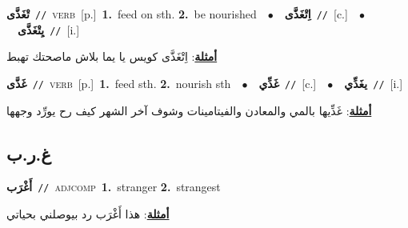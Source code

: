 \documentclass[10pt,a4paper,twoside]{article} %
\begin{document}
\begin{multicols}{2}
{\setlength\topsep{0pt}\textbf{\foreignlanguage{arabic}{تْغَذَّى}}\ {\color{gray}\texttt{//}\color{black}}\ \textsc{verb}\ [p.]\ \textbf{1.}~feed on sth.  \textbf{2.}~be nourished\ \ $\bullet$\ \ \setlength\topsep{0pt}\textbf{\foreignlanguage{arabic}{اِتْغَذَّى}}\ {\color{gray}\texttt{//}\color{black}}\ [c.]\ \ $\bullet$\ \ \setlength\topsep{0pt}\textbf{\foreignlanguage{arabic}{يِتْغَذَّى}}\ {\color{gray}\texttt{//}\color{black}}\ [i.]\  \begin{flushright}\color{gray}\foreignlanguage{arabic}{\textbf{\underline{\foreignlanguage{arabic}{أمثلة}}}: اِتْغَذَّى كويس يا يما بلاش ماصحتك تهبط}\end{flushright}\color{black}} \vspace{2mm}

{\setlength\topsep{0pt}\textbf{\foreignlanguage{arabic}{غَذَّى}}\ {\color{gray}\texttt{//}\color{black}}\ \textsc{verb}\ [p.]\ \textbf{1.}~feed sth.  \textbf{2.}~nourish sth\ \ $\bullet$\ \ \setlength\topsep{0pt}\textbf{\foreignlanguage{arabic}{غَذِّي}}\ {\color{gray}\texttt{//}\color{black}}\ [c.]\ \ $\bullet$\ \ \setlength\topsep{0pt}\textbf{\foreignlanguage{arabic}{يغَذِّي}}\ {\color{gray}\texttt{//}\color{black}}\ [i.]\  \begin{flushright}\color{gray}\foreignlanguage{arabic}{\textbf{\underline{\foreignlanguage{arabic}{أمثلة}}}: غَذِّيها بالمي والمعادن والفيتامينات وشوف آخر الشهر كيف رح يورِّد وجهها}\end{flushright}\color{black}} \vspace{2mm}

\vspace{-3mm}
\subsection*{\color{blue}\foreignlanguage{arabic}{غ.ر.ب}\color{blue}{}} 

{\setlength\topsep{0pt}\textbf{\foreignlanguage{arabic}{أَغْرَب}}\ {\color{gray}\texttt{//}\color{black}}\ \textsc{adj\textunderscore comp}\ \textbf{1.}~stranger  \textbf{2.}~strangest\  \begin{flushright}\color{gray}\foreignlanguage{arabic}{\textbf{\underline{\foreignlanguage{arabic}{أمثلة}}}: هذا أَغْرَب رد بيوصلني بحياتي}\end{flushright}\color{black}} \vspace{2mm}


\end{multicols}
\end{document}
